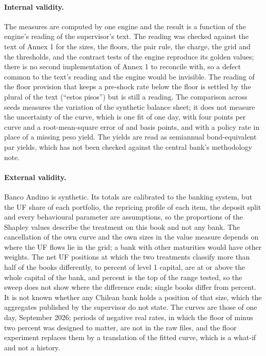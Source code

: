 \paragraph{Internal validity.}
The measures are computed by one engine and the result is a function of the engine's reading of the supervisor's text. The reading was checked against the text of Annex 1 for the sizes, the floors, the pair rule, the charge, the grid and the thresholds, and the contract tests of the engine reproduce its golden values; there is no second implementation of Annex 1 to reconcile with, so a defect common to the text's reading and the engine would be invisible. The reading of the floor provision that keeps a pre-shock rate below the floor is settled by the plural of the text (``estos pisos'') but is still a reading. The comparison across seeds measures the variation of the synthetic balance sheet; it does not measure the uncertainty of the curve, which is one fit of one day, with four points per curve and a root-mean-square error of \rmseClp{} and \rmseUr{} basis points, and with a policy rate in place of a missing peso yield. The yields are read as semiannual bond-equivalent par yields, which has not been checked against the central bank's methodology note.

\paragraph{External validity.}
Banco Andino is synthetic. Its totals are calibrated to the banking system, but the UF share of each portfolio, the repricing profile of each item, the deposit split and every behavioural parameter are assumptions, so the proportions of the Shapley values describe the treatment on this book and not any bank. The cancellation of the own curve and the own sizes in the value measure depends on where the UF flows lie in the grid; a bank with other maturities would have other weights. The net UF positions at which the two treatments classify more than half of the books differently, \sweepMajLo{} to \sweepMajHi{} percent of level 1 capital, are at or above the whole capital of the bank, and \sweepGridHi{} percent is the top of the range tested, so the sweep does not show where the difference ends; single books differ from \sweepFirstDiff{} percent. It is not known whether any Chilean bank holds a position of that size, which the aggregates published by the supervisor do not state. The curves are those of one day, September 2026; periods of negative real rates, in which the floor of minus two percent was designed to matter, are not in the raw files, and the floor experiment replaces them by a translation of the fitted curve, which is a what-if and not a history.


